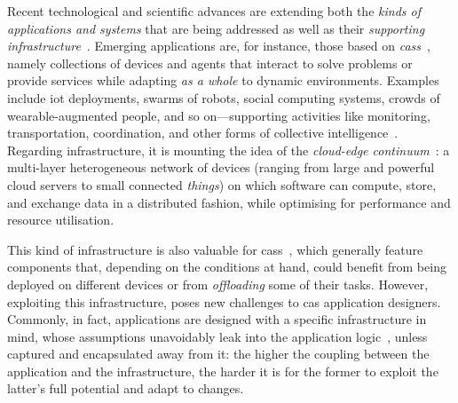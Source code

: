 \documentclass[conference]{IEEEtran}
\begin{document}
Recent technological and scientific advances
 are extending 
 both the \emph{kinds of applications and systems} that are being addressed  
 as well as their \emph{supporting infrastructure}~\cite{DBLP:journals/iot/GillXOPBSGSWASM22}.
%
Emerging applications
 are, for instance, those based on \emph{\acp{cas}}~\cite{DBLP:journals/computer/Abowd16,DBLP:journals/sttt/NicolaJW20},
 namely collections of devices and agents
 that interact to solve problems or provide services while adapting \emph{as a whole} to dynamic environments.
%
Examples include 
  \ac{iot} deployments, 
  swarms of robots,
  social computing systems,
  crowds of wearable-augmented people, and so on---supporting activities like monitoring,
  transportation, coordination, and other forms of collective intelligence~\cite{casadei2023artl-ci}.
%
Regarding infrastructure,
 it is mounting the idea of the \emph{cloud-edge continuum}~\cite{DBLP:journals/iot/BittencourtISFM18}: 
a multi-layer heterogeneous network of devices (ranging from large and powerful cloud servers to small connected \emph{things})
on which software can compute, store, and exchange data in a distributed fashion, while 
optimising for performance and resource utilisation.
%

This kind of infrastructure is also valuable for  \acp{cas}~\cite{DBLP:journals/tpds/HongCHGZ19,DBLP:journals/comsur/WangZZMLW20,DBLP:journals/comsur/AfrinJRRWH21,IEEE-IoTJ-pulverization-simulation},
which generally feature components that,
depending on the conditions at hand,
could benefit from being deployed on different devices or from \emph{offloading} some of their  tasks.
%
However, exploiting this infrastructure,
 poses new challenges to \ac{cas} application designers.
%
Commonly, in fact, applications are designed with a specific infrastructure in mind,
whose assumptions unavoidably leak into the application logic~\cite{Spolsky2004},
unless captured and encapsulated away from it:
the higher the coupling between the application and the infrastructure,
the harder it is for the former to exploit the latter's full potential and adapt to changes.
\end{document}
